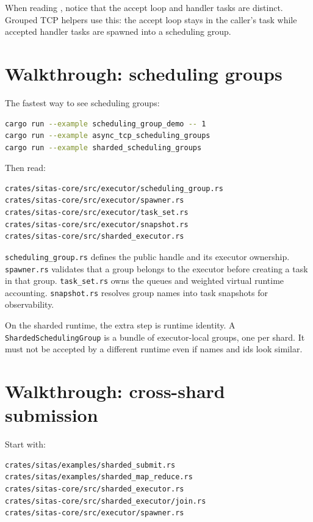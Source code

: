 When reading , notice that the accept loop and
handler tasks are distinct. Grouped TCP helpers use this: the accept loop stays
in the caller's task while accepted handler tasks are spawned into a scheduling
group.

\section{Walkthrough: scheduling groups}

The fastest way to see scheduling groups:

\begin{lstlisting}[language=bash,caption={Scheduling group examples}]
cargo run --example scheduling_group_demo -- 1
cargo run --example async_tcp_scheduling_groups
cargo run --example sharded_scheduling_groups
\end{lstlisting}

Then read:

\begin{lstlisting}[language={},caption={Scheduling group reading path}]
crates/sitas-core/src/executor/scheduling_group.rs
crates/sitas-core/src/executor/spawner.rs
crates/sitas-core/src/executor/task_set.rs
crates/sitas-core/src/executor/snapshot.rs
crates/sitas-core/src/sharded_executor.rs
\end{lstlisting}

\texttt{scheduling\_group.rs} defines the public handle and its executor
ownership. \texttt{spawner.rs} validates that a group belongs to the executor
before creating a task in that group. \texttt{task\_set.rs} owns the queues and
weighted virtual runtime accounting. \texttt{snapshot.rs} resolves group names
into task snapshots for observability.

On the sharded runtime, the extra step is runtime identity. A
\texttt{ShardedSchedulingGroup} is a bundle of executor-local groups, one per
shard. It must not be accepted by a different runtime even if names and ids
look similar.

\section{Walkthrough: cross-shard submission}

Start with:

\begin{lstlisting}[language={},caption={Cross-shard reading path}]
crates/sitas/examples/sharded_submit.rs
crates/sitas/examples/sharded_map_reduce.rs
crates/sitas-core/src/sharded_executor.rs
crates/sitas-core/src/sharded_executor/join.rs
crates/sitas-core/src/executor/spawner.rs
\end{lstlisting}


